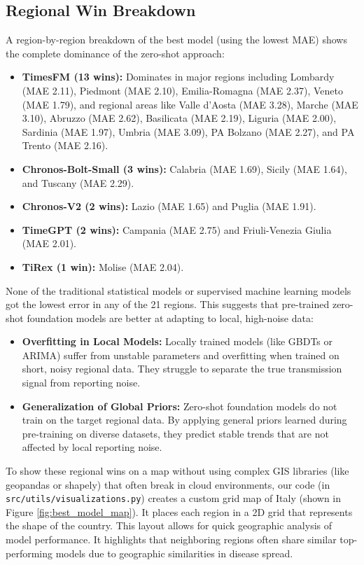 \subsection{Regional Win Breakdown}
A region-by-region breakdown of the best model (using the lowest MAE) shows the complete dominance of the zero-shot approach:

\begin{itemize}
    \item \textbf{TimesFM (13 wins):} Dominates in major regions including Lombardy (MAE 2.11), Piedmont (MAE 2.10), Emilia-Romagna (MAE 2.37), Veneto (MAE 1.79), and regional areas like Valle d'Aosta (MAE 3.28), Marche (MAE 3.10), Abruzzo (MAE 2.62), Basilicata (MAE 2.19), Liguria (MAE 2.00), Sardinia (MAE 1.97), Umbria (MAE 3.09), PA Bolzano (MAE 2.27), and PA Trento (MAE 2.16).
    \item \textbf{Chronos-Bolt-Small (3 wins):} Calabria (MAE 1.69), Sicily (MAE 1.64), and Tuscany (MAE 2.29).
    \item \textbf{Chronos-V2 (2 wins):} Lazio (MAE 1.65) and Puglia (MAE 1.91).
    \item \textbf{TimeGPT (2 wins):} Campania (MAE 2.75) and Friuli-Venezia Giulia (MAE 2.01).
    \item \textbf{TiRex (1 win):} Molise (MAE 2.04).
\end{itemize}

None of the traditional statistical models or supervised machine learning models got the lowest error in any of the 21 regions. This suggests that pre-trained zero-shot foundation models are better at adapting to local, high-noise data:
\begin{itemize}
    \item \textbf{Overfitting in Local Models:} Locally trained models (like GBDTs or ARIMA) suffer from unstable parameters and overfitting when trained on short, noisy regional data. They struggle to separate the true transmission signal from reporting noise.
    \item \textbf{Generalization of Global Priors:} Zero-shot foundation models do not train on the target regional data. By applying general priors learned during pre-training on diverse datasets, they predict stable trends that are not affected by local reporting noise.
\end{itemize}

To show these regional wins on a map without using complex GIS libraries (like geopandas or shapely) that often break in cloud environments, our code (in \texttt{src/utils/visualizations.py}) creates a custom grid map of Italy (shown in Figure \ref{fig:best_model_map}). It places each region in a 2D grid that represents the shape of the country. This layout allows for quick geographic analysis of model performance. It highlights that neighboring regions often share similar top-performing models due to geographic similarities in disease spread.

